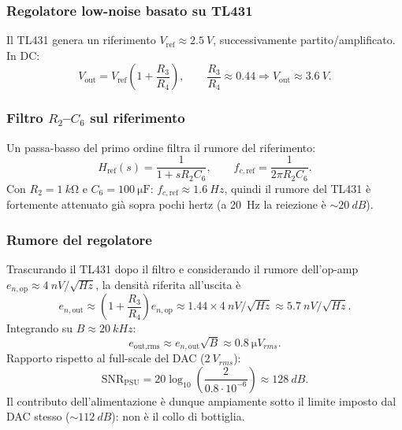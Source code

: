 \subsubsection{Regolatore low-noise basato su TL431}
Il TL431 genera un riferimento $V_{\text{ref}}\approx\SI{2.5}{V}$,
successivamente partito/amplificato. In DC:
\begin{equation}
  V_{\text{out}}=V_{\text{ref}}\left(1+\frac{R_3}{R_4}\right),
  \qquad \frac{R_3}{R_4}\approx0.44 \Rightarrow V_{\text{out}}\approx\SI{3.6}{V}.
\end{equation}

\subsubsection{Filtro \texorpdfstring{$R_2$--$C_6$}{R2-C6} sul riferimento}
Un passa-basso del primo ordine filtra il rumore del riferimento:
\begin{equation}
  H_{\text{ref}}(s)=\frac{1}{1+sR_2C_6},\qquad
  f_{c,\text{ref}}=\frac{1}{2\pi R_2C_6}.
\end{equation}
Con $R_2=\SI{1}{k\ohm}$ e $C_6=\SI{100}{\micro\farad}$:
$f_{c,\text{ref}}\approx\SI{1.6}{Hz}$, quindi il rumore del TL431 è
fortemente attenuato già sopra pochi hertz (a \SI{20}{Hz} la reiezione è
$\sim\SI{20}{dB}$).

\subsubsection{Rumore del regolatore}
Trascurando il TL431 dopo il filtro e considerando il rumore dell'op-amp
$e_{n,\text{op}}\approx\SI{4}{nV/\sqrt{Hz}}$, la densità riferita
all'uscita è
\begin{equation}
  e_{n,\text{out}}\approx\left(1+\frac{R_3}{R_4}\right)e_{n,\text{op}}
  \approx1.44\times\SI{4}{nV/\sqrt{Hz}}\approx\SI{5.7}{nV/\sqrt{Hz}}.
\end{equation}
Integrando su $B\approx\SI{20}{kHz}$:
\begin{equation}
  e_{\text{out,rms}}\approx e_{n,\text{out}}\sqrt{B}\approx\SI{0.8}{\micro V_{rms}}.
\end{equation}
Rapporto rispetto al full-scale del DAC ($\SI{2}{V_{rms}}$):
\begin{equation}
  \text{SNR}_{\text{PSU}}=20\log_{10}\!\left(\frac{2}{0.8\cdot10^{-6}}\right)
  \approx\SI{128}{dB}.
\end{equation}
Il contributo dell'alimentazione è dunque ampiamente sotto il limite
imposto dal DAC stesso ($\sim\SI{112}{dB}$): non è il collo di bottiglia.

